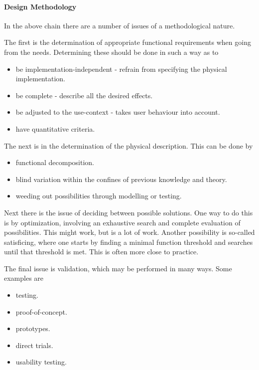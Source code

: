 \paragraph{Design Methodology}
In the above chain there are a number of issues of a methodological nature.

The first is the determination of appropriate functional requirements when going from the needs. Determining these should be done in such a way as to
\begin{itemize}
	\item be implementation-independent - refrain from specifying the physical implementation.
	\item be complete - describe all the desired effects.
	\item be adjusted to the use-context - takes user behaviour into account.
	\item have quantitative criteria.
\end{itemize}

The next is in the determination of the physical description. This can be done by
\begin{itemize}
	\item functional decomposition.
	\item blind variation within the confines of previous knowledge and theory.
	\item weeding out possibilities through modelling or testing.
\end{itemize}

Next there is the issue of deciding between possible solutions. One way to do this is by optimization, involving an exhaustive search and complete evaluation of possibilities. This might work, but is a lot of work. Another possibility is so-called satisficing, where one starts by finding a minimal function threshold and searches until that threshold is met. This is often more close to practice.

The final issue is validation, which may be performed in many ways. Some examples are
\begin{itemize}
	\item testing.
	\item proof-of-concept.
	\item prototypes.
	\item direct trials.
	\item usability testing.
\end{itemize}